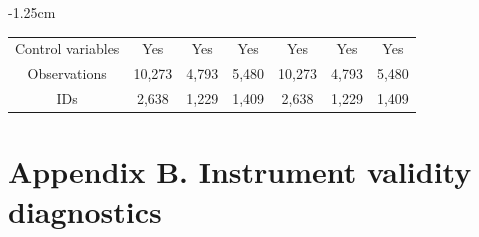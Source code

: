 \documentclass[arguments, manuscript, 11pt]{aastex631}
\begin{document}
\begin{table}[h]
\begin{adjustwidth}{-1.25cm}{}
{\begin{tabular}{@{}ccccccc@{}}
Control variables & Yes & Yes & Yes & Yes & Yes & Yes \\
Observations & 10,273 & 4,793 & 5,480 & 10,273 & 4,793 & 5,480 \\
IDs & 2,638 & 1,229 & 1,409 & 2,638 & 1,229 & 1,409 \\ \bottomrule
\end{tabular}%
}
\end{adjustwidth}
\end{table}

\newpage
{}
\FloatBarrier
\section*{Appendix B. Instrument validity diagnostics} \label{sec:appendixB}
\setcounter{table}{0}
\renewcommand{\thetable}{B\arabic{table}}
\setcounter{figure}{0}
\renewcommand{\thefigure}{B\arabic{figure}}
\end{document}
